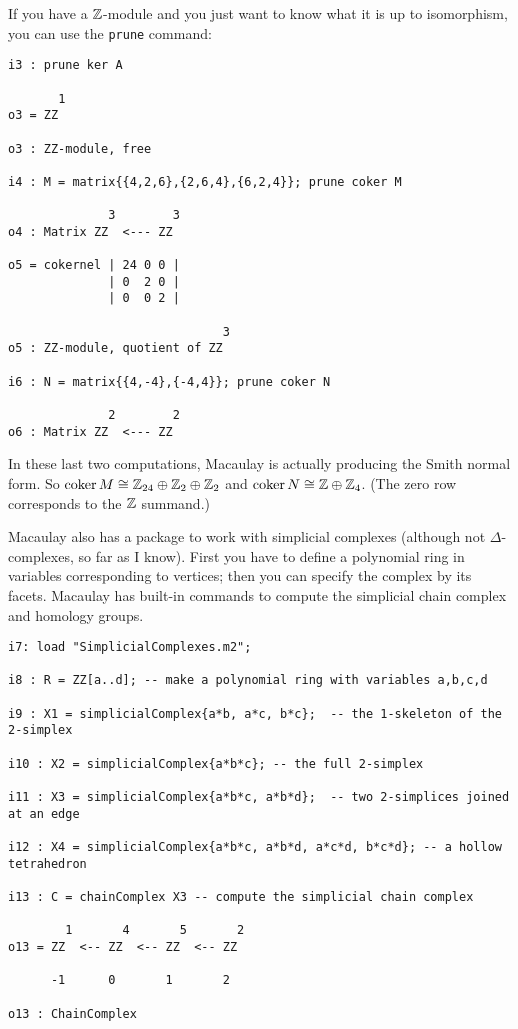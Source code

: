 \pagebreak

If you have a $\mathbb{Z}$-module and you just want to know what it is
up to isomorphism, you can use the \texttt{prune} command:
\begin{framed}
\begin{verbatim}
i3 : prune ker A

       1
o3 = ZZ

o3 : ZZ-module, free

i4 : M = matrix{{4,2,6},{2,6,4},{6,2,4}}; prune coker M

              3        3
o4 : Matrix ZZ  <--- ZZ

o5 = cokernel | 24 0 0 |
              | 0  2 0 |
              | 0  0 2 |

                              3
o5 : ZZ-module, quotient of ZZ

i6 : N = matrix{{4,-4},{-4,4}}; prune coker N

              2        2
o6 : Matrix ZZ  <--- ZZ

\end{verbatim}
\end{framed}

In these last two computations, Macaulay is actually producing the Smith normal form.  So $\operatorname{coker} M\cong\mathbb{Z}_{24}\oplus\mathbb{Z}_2\oplus\mathbb{Z}_2$ and $\operatorname{coker} N\cong\mathbb{Z}\oplus\mathbb{Z}_4$.  (The zero row corresponds to the $\mathbb{Z}$ summand.)

Macaulay also has a package to work with simplicial complexes (although not $\Delta$-complexes, so far as I know).  First you have to define a polynomial ring in variables corresponding to vertices; then you can specify the complex by its facets.  Macaulay has built-in commands to compute the simplicial chain complex and homology groups.

\begin{framed}
\begin{verbatim}
i7: load "SimplicialComplexes.m2";

i8 : R = ZZ[a..d]; -- make a polynomial ring with variables a,b,c,d

i9 : X1 = simplicialComplex{a*b, a*c, b*c};  -- the 1-skeleton of the 2-simplex

i10 : X2 = simplicialComplex{a*b*c}; -- the full 2-simplex

i11 : X3 = simplicialComplex{a*b*c, a*b*d};  -- two 2-simplices joined at an edge

i12 : X4 = simplicialComplex{a*b*c, a*b*d, a*c*d, b*c*d}; -- a hollow tetrahedron

i13 : C = chainComplex X3 -- compute the simplicial chain complex

        1       4       5       2
o13 = ZZ  <-- ZZ  <-- ZZ  <-- ZZ

      -1      0       1       2

o13 : ChainComplex
\end{verbatim}
\end{framed}


